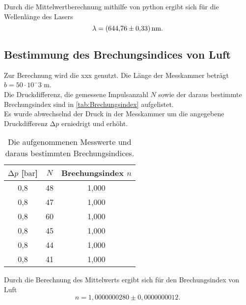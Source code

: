   Durch die Mittelwertberechnung mithilfe von python \cite{uncertainties} ergibt sich für die Wellenlänge des Lasers
\begin{equation*}
  \lambda = \SI{644,76 \pm 0,33}{\nano\metre}.
\end{equation*}



\subsection{Bestimmung des Brechungsindices von Luft}

Zur Berechnung wird die xxx genutzt. Die Länge der Messkammer beträgt $b = 50 \cdot 10^-3$ m.\\
Die Druckdifferenz, die gemessene Impulsanzahl $N$ sowie der daraus bestimmte Brechungsindex sind in \autoref{tab:Brechungsindex} aufgelistet.\\
Es wurde abwechselnd der Druck in der Messkammer um die angegebene Druckdifferenz $\increment p$ erniedrigt und erhöht.\\

  \begin{table}[h]
    \centering
    \caption{Die aufgenommenen Messwerte und daraus bestimmten Brechungsindices.}
    \label{tab:Brechungsindex}
    \begin{tabular}{c c c}
      \toprule
      {$\increment p$ [$\si{\bar}$]} & {$N$} & {Brechungsindex $n$} \\
      \midrule
      0,8    &   48  &  1,000 \\
      0,8    &   47  &  1,000 \\
      0,8    &   60  &  1,000 \\
      0,8    &   45  &  1,000 \\
      0,8    &   44  &  1,000 \\
      0,8    &   41  &  1,000 \\
      
      \bottomrule
    \end{tabular}
  \end{table}
  \noindent
  Durch die Berechnung des Mittelwerts ergibt sich für den Brechungsindex von Luft
  \begin{equation*}
    n = 1,0000000280 \pm 0,0000000012.
  \end{equation*}